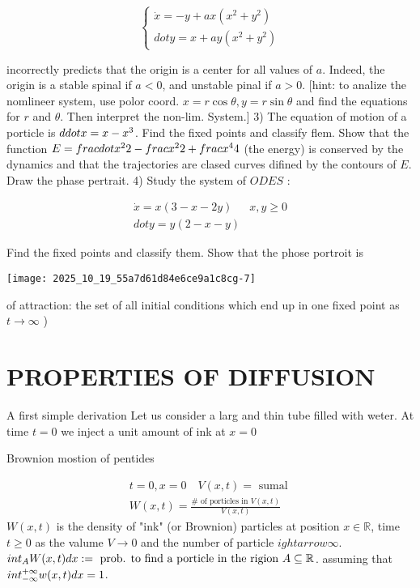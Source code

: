 $$
\left\{\begin{array}{l}
\dot{x}=-y+a x\left(x^{2}+y^{2}\right) \\dot{y}=x+a y\left(x^{2}+y^{2}\right)
\end{array}\right.
$$

incorrectly predicts that the origin is a center for all values of $a$. Indeed, the origin is a stable spinal if $a<0$, and unstable pinal if $a>0$.
[hint: to analize the nomlineer system, use polor coord. $x=r \cos \theta, y=r \sin \theta$ and find the equations for $r$ and $\theta$. Then interpret the non-lim. System.]
3) The equation of motion of a porticle is $\\ddot{x}=x-x^{3}$. Find the fixed points and classify flem. Show that the function $E=\\frac{\\dot{x}^{2}}{2}-\\frac{x^{2}}{2}+\\frac{x^{4}}{4}$ (the energy) is conserved by the dynamics and that the trajectories are clased curves difined by the contours of $E$. Draw the phase pertrait.
4) Study the system of $O D E S$ :

$$
\begin{array}{ll}
\dot{x}=x(3-x-2 y) & x, y \geqslant 0 \\dot{y}=y(2-x-y) &
\end{array}
$$

Find the fixed points and classify them. Show that the phose portroit is
\begin{center}
\texttt{[image: 2025\_10\_19\_55a7d61d84e6ce9a1c8cg-7]}
\end{center}
\basin of attraction: the set of all initial conditions which end up in one fixed point as $t \rightarrow \infty$ )

\section*{PROPERTIES OF DIFFUSION}
A first simple derivation
Let us consider a larg and thin tube filled with weter. At time $t=0$ we inject a unit amount of ink at $x=0$

Brownion mostion of pentides

$$
\begin{gathered}
 t=0, x=0 \quad V(x, t)=\text { sumal } \\W(x, t)=\frac{\# \text { of porticles in } V(x, t)}{V(x, t)}
\end{gathered}
$$
$W(x, t)$ is the density of "ink" (or Brownion) particles at position $x \in \mathbb{R}$, time $t \geqslant 0$ as the valume $V \rightarrow 0$ and the number of particle $ightarrow \infty$.
$\\int_{A} W(x, t) d x:=\text { prob. to find a porticle in the rigion } A \subseteq \mathbb{R}$. assuming that $\\int_{-\infty}^{+\infty} w(x, t) d x=1$.